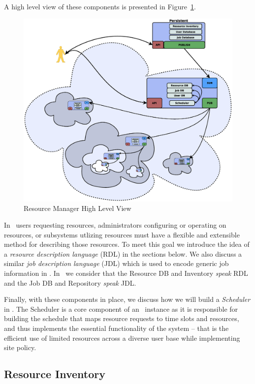A high level view of these components is presented in Figure~\ref{RMComponents}.

\begin{figure}
\centering
\includegraphics[scale=0.20]{../fig/RM-full.eps}
\caption{Resource Manager High Level View}
\label{RMComponents}
\end{figure}

In \ngrm\ users requesting resources, administrators configuring
or operating on resources, or subsystems utlizing resources
must have a flexible and extensible method for describing those
resources.  To meet this goal we introduce the idea of a {\em
resource description language} (RDL) in the sections below. We
also discuss a similar {\em job description language} (JDL) which
is used to encode generic job information in \ngrm. In \ngrm\
we consider that the Resource DB and Inventory {\em speak} RDL
and the Job DB and Repository {\em speak} JDL.

Finally, with these components in place, we discuss how we will
build a {\em Scheduler} in \ngrm. The Scheduler is a core component
of an \ngrm\ instance as it is responsible for building the schedule
that maps resource requests to time slots and resources, and thus
implements the essential functionality of the system -- that is the
efficient use of limited resources across a diverse user base while
implementing site policy.

\subsection{Resource Inventory}
\label{sect:resdb}

